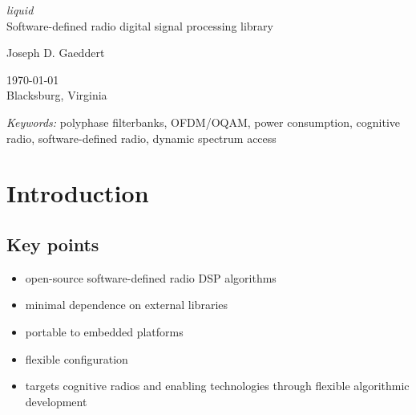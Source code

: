 \documentclass[11pt,twoside]{report}
\begin{document}



%
%
\thispagestyle{empty}
\begin{center}

{\huge\it liquid} \\
Software-defined radio digital signal processing library

\vfill

Joseph D. Gaeddert

\vfill

\today \\
Blacksburg, Virginia

\vfill

{\it Keywords:}
polyphase filterbanks,
OFDM/OQAM,
power consumption,
cognitive radio,
software-defined radio,
dynamic spectrum access
\\

\end{center}

\pagebreak
%
%
\tableofcontents
\pagebreak





%
%
\chapter{Introduction}
\label{ch:introduction}

\section{Key points}
\begin{itemize}
\item open-source software-defined radio DSP algorithms
\item minimal dependence on external libraries
\item portable to embedded platforms
\item flexible configuration
\item targets cognitive radios and enabling technologies through
      flexible algorithmic development
\end{itemize}
\end{document}
